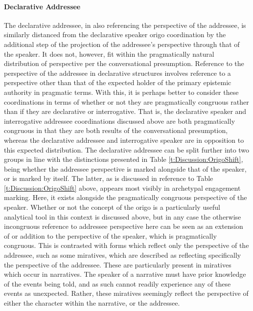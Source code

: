 \paragraph{Declarative Addressee}
The declarative addressee, in also referencing the perspective of the addressee, is similarly distanced from the declarative speaker origo coordination by the additional step of the projection of the addressee's perspective through that of the speaker. It does not, however, fit within the pragmatically natural distribution of perspective per the conversational presumption. Reference to the perspective of the addressee in declarative structures involves reference to a perspective other than that of the expected holder of the primary epistemic authority in pragmatic terms. With this, it is perhaps better to consider these coordinations in terms of whether or not they are pragmatically congruous rather than if they are declarative or interrogative. That is, the declarative speaker and interrogative addressee coordinations discussed above are both pragmatically congruous in that they are both results of the conversational presumption, whereas the declarative addressee and interrogative speaker are in opposition to this expected distribution. The declarative addressee can be split further into two groups in line with the distinctions presented in Table \ref{t:Discussion:OrigoShift}, being whether the addressee perspective is marked alongside that of the speaker, or is marked by itself. The latter, as is discussed in reference to Table \ref{t:Discussion:OrigoShift} above, appears most visibly in archetypal engagement marking. Here, it exists alongside the pragmatically congruous perspective of the speaker. Whether or not the concept of the origo is a particularly useful analytical tool in this context is discussed above, but in any case the otherwise incongruous reference to addressee perspective here can be seen as an extension of or addition to the perspective of the speaker, which is pragmatically congruous. This is contrasted with forms which reflect only the perspective of the addressee, such as some miratives, which are described as reflecting specifically the perspective of the addressee. These are particularly present in miratives which occur in narratives. The speaker of a narrative must have prior knowledge of the events being told, and as such cannot readily experience any of these events as unexpected. Rather, these miratives seemingly reflect the perspective of either the character within the narrative, or the addressee. 
